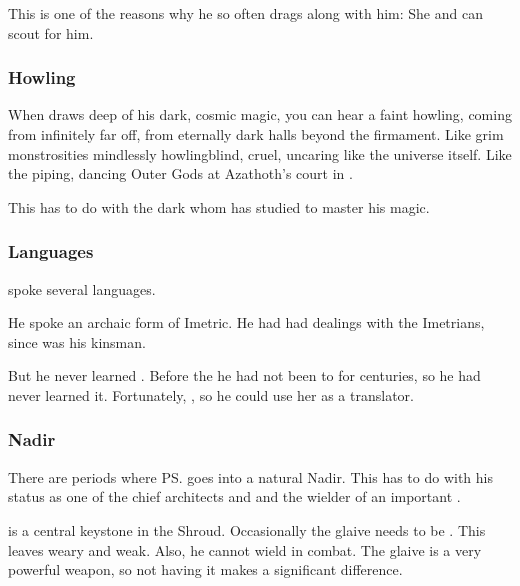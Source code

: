 This is one of the reasons why he so often drags \Criseis{} along with him: 
She  and can scout for him. 





\subsubsection{Howling}
When \Ishnaruchaefir{} draws deep of his dark, cosmic magic, you can hear a faint howling, coming from infinitely far off, from eternally dark halls beyond the firmament. Like grim monstrosities mindlessly howling\dash blind, cruel, uncaring like the universe itself. Like the piping, dancing Outer Gods at Azathoth's court in . 

This has to do with the dark  whom \Ishnaruchaefir{} has studied to master his magic. 





\subsubsection{Languages}
\Ishnaruchaefir{} spoke several languages. 

He spoke an archaic form of Imetric. 
He had had dealings with the Imetrians, since \Sarokash was his kinsman. 

But he never learned \Velcadian. 
Before the \thirdbanewar{} he had not been to \Azmith{} for centuries, so he had never learned it. 
Fortunately, , so he could use her as a translator. 





\subsubsection{Nadir}
There are periods where \ps{\Ishnaruchaefir} \vertex{} goes into a natural Nadir. 
This has to do with his status as one of the chief architects and  and the wielder of an important . 

\Rystessakhin{} is a central keystone in the Shroud. 
Occasionally the glaive needs to be . 
This leaves \Ishnaruchaefir{} weary and weak. 
Also, he cannot wield \Rystessakhin{} in combat.
The glaive is a very powerful weapon, so not having it makes a significant difference. 


